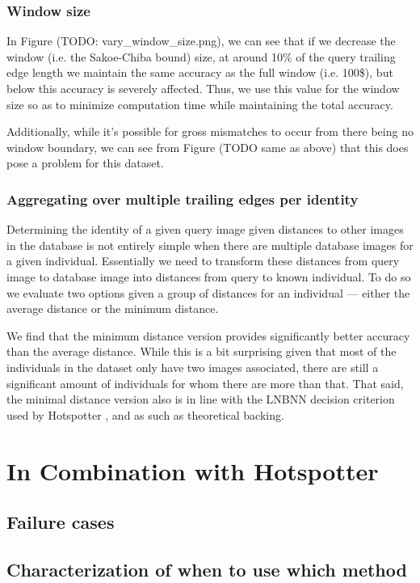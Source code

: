 \subsubsection{Window size}

In Figure (TODO: vary\_window\_size.png), we can see that if we decrease the window (i.e. the Sakoe-Chiba bound) size, at around 10\% of the query trailing edge length we maintain the same accuracy as the full window (i.e. 100\$), but below this accuracy is severely affected.
Thus, we use this value for the window size so as to minimize computation time while maintaining the total accuracy.

Additionally, while it's possible for gross mismatches to occur from there being no window boundary, we can see from Figure (TODO same as above) that this does pose a problem for this dataset.

\subsubsection{Aggregating over multiple trailing edges per identity}

Determining the identity of a given query image given distances to other images in the database is not entirely simple when there are multiple database images for a given individual.
Essentially we need to transform these distances from query image to database image into distances from query to known individual.
To do so we evaluate two options given a group of distances for an individual --- either the average distance or the minimum distance.

We find that the minimum distance version provides significantly better accuracy than the average distance. %
While this is a bit surprising given that most of the individuals in the dataset only have two images associated, there are still a significant amount of individuals for whom there are more than that.
That said, the minimal distance version also is in line with the LNBNN decision criterion used by Hotspotter \cite{crall_hotspotter_2013}, and as such as theoretical backing. %

\section{In Combination with Hotspotter}

\subsection{Failure cases}

\subsection{Characterization of when to use which method}


